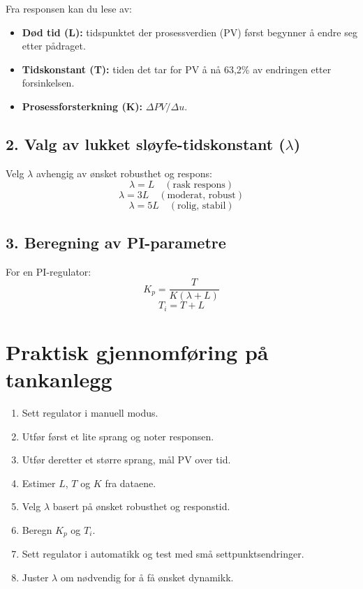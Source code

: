 \documentclass{minmal}
\begin{document}
Fra responsen kan du lese av:
\begin{itemize}
    \item \textbf{Død tid (L):} tidspunktet der prosessverdien (PV) først begynner å endre seg etter pådraget.
    \item \textbf{Tidskonstant (T):} tiden det tar for PV å nå 63,2\% av endringen etter forsinkelsen.
    \item \textbf{Prosessforsterkning (K):} $\Delta PV / \Delta u$.
\end{itemize}
 
\subsection{2. Valg av lukket sløyfe-tidskonstant (\texorpdfstring{$\lambda$}{lambda})}
Velg $\lambda$ avhengig av ønsket robusthet og respons:
\[
\lambda = L \quad (\text{rask respons})
\]
\[
\lambda = 3 L \quad (\text{moderat, robust})
\]
\[
\lambda = 5 L \quad (\text{rolig, stabil})
\]
 
\subsection{3. Beregning av PI-parametre}
For en PI-regulator:
\begin{equation}
K_p = \frac{T}{K (\lambda + L)}
\end{equation}
\begin{equation}
T_i = T + L
\end{equation}
 
\section{Praktisk gjennomføring på tankanlegg}
\begin{enumerate}
    \item Sett regulator i manuell modus.
    \item Utfør først et lite sprang og noter responsen.
    \item Utfør deretter et større sprang, mål PV over tid.
    \item Estimer $L$, $T$ og $K$ fra dataene.
    \item Velg $\lambda$ basert på ønsket robusthet og responstid.
    \item Beregn $K_p$ og $T_i$.
    \item Sett regulator i automatikk og test med små settpunktsendringer.
    \item Juster $\lambda$ om nødvendig for å få ønsket dynamikk.
\end{enumerate}
 
\end{document}
